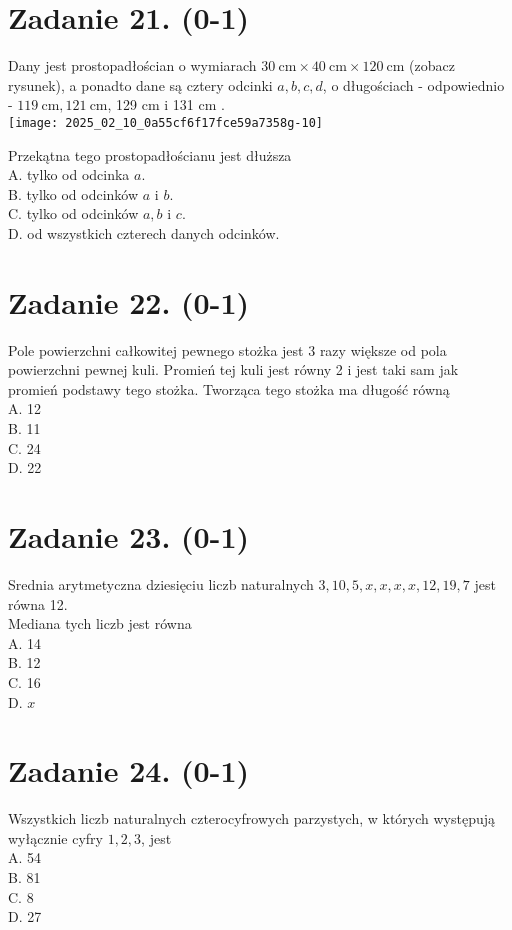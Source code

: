 \documentclass[10pt]{article}
\begin{document}
\section*{Zadanie 21. (0-1)}
Dany jest prostopadłościan o wymiarach \(30 \mathrm{~cm} \times 40 \mathrm{~cm} \times 120 \mathrm{~cm}\) (zobacz rysunek), a ponadto dane są cztery odcinki \(a, b, c, d\), o długościach - odpowiednio - \(119 \mathrm{~cm}, 121 \mathrm{~cm}\), 129 cm i 131 cm .\\
\texttt{[image: 2025\_02\_10\_0a55cf6f17fce59a7358g-10]}

Przekątna tego prostopadłościanu jest dłuższa\\
A. tylko od odcinka \(a\).\\
B. tylko od odcinków \(a\) i \(b\).\\
C. tylko od odcinków \(a, b\) i \(c\).\\
D. od wszystkich czterech danych odcinków.

\section*{Zadanie 22. (0-1)}
Pole powierzchni całkowitej pewnego stożka jest 3 razy większe od pola powierzchni pewnej kuli. Promień tej kuli jest równy 2 i jest taki sam jak promień podstawy tego stożka. Tworząca tego stożka ma długość równą\\
A. 12\\
B. 11\\
C. 24\\
D. 22

\section*{Zadanie 23. (0-1)}
Srednia arytmetyczna dziesięciu liczb naturalnych \(3,10,5, x, x, x, x, 12,19,7\) jest równa 12.\\
Mediana tych liczb jest równa\\
A. 14\\
B. 12\\
C. 16\\
D. \(x\)

\section*{Zadanie 24. (0-1)}
Wszystkich liczb naturalnych czterocyfrowych parzystych, w których występują wyłącznie cyfry \(1,2,3\), jest\\
A. 54\\
B. 81\\
C. 8\\
D. 27
\end{document}
